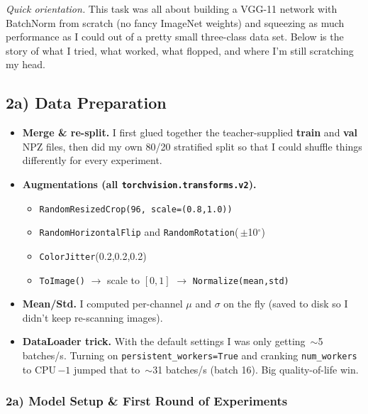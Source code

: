 \documentclass[10pt]{article}
\begin{document}
\noindent\emph{Quick orientation.}  
This task was all about building a VGG-11 network with BatchNorm from scratch (no fancy ImageNet weights) and squeezing as much performance as I could out of a pretty small three-class data set.  
Below is the story of what I tried, what worked, what flopped, and where I’m still scratching my head.

\subsection*{2a) Data Preparation}

\begin{itemize}
  \item \textbf{Merge \& re-split.} I first glued together the teacher-supplied \textbf{train} and \textbf{val} NPZ files, then did my own 80/20 stratified split so that I could shuffle things differently for every experiment.
  \item \textbf{Augmentations (all \texttt{torchvision.transforms.v2}).}
    \begin{itemize}
      \item \texttt{RandomResizedCrop(96, scale=(0.8,1.0))}  
      \item \texttt{RandomHorizontalFlip} and \texttt{RandomRotation}(\,$\pm$10$^{\circ}$)  
      \item \texttt{ColorJitter}(0.2,0.2,0.2)  
      \item \texttt{ToImage()} $\rightarrow$ scale to $[0,1]$ $\rightarrow$ \texttt{Normalize(mean,std)}
    \end{itemize}
  \item \textbf{Mean/Std.} I computed per-channel $\mu$ and $\sigma$ on the fly (saved to disk so I didn’t keep re-scanning images).
  \item \textbf{DataLoader trick.} With the default settings I was only getting \,$\sim$5 batches/s.  
        Turning on \texttt{persistent\_workers=True} and cranking \texttt{num\_workers} to CPU\,$-1$ jumped that to \,$\sim$31 batches/s (batch 16). Big quality-of-life win.
\end{itemize}

\subsubsection*{2a) Model Setup \& First Round of Experiments}
\end{document}

